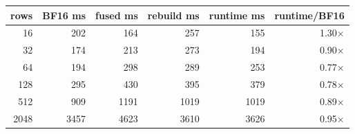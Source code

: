 \begin{tabular}{rrrrrr}
\toprule
rows & BF16 ms & fused ms & rebuild ms & runtime ms & runtime/BF16 \\
\midrule
16 & 202 & 164 & 257 & 155 & 1.30$\times$ \\
32 & 174 & 213 & 273 & 194 & 0.90$\times$ \\
64 & 194 & 298 & 289 & 253 & 0.77$\times$ \\
128 & 295 & 430 & 395 & 379 & 0.78$\times$ \\
512 & 909 & 1191 & 1019 & 1019 & 0.89$\times$ \\
2048 & 3457 & 4623 & 3610 & 3626 & 0.95$\times$ \\
\bottomrule
\end{tabular}
